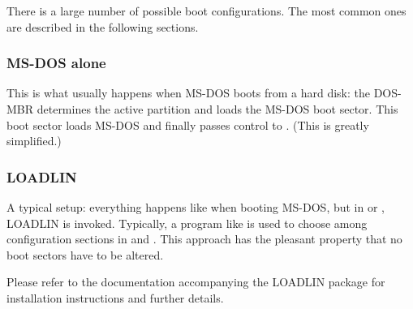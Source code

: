 There is a large number of possible boot configurations. The most common
ones are described in the following sections.


\subsubsection{MS-DOS alone}


This is what usually happens when MS-DOS boots from a hard disk: the DOS-MBR
determines the active partition and loads the MS-DOS boot sector. This boot
sector loads MS-DOS and finally passes control to . (This is
greatly simplified.)


\subsubsection{LOADLIN}


A typical  setup: everything happens like when booting MS-DOS,
but in  or , LOADLIN is invoked. Typically,
a program like  is used to choose among configuration sections
in  and .
This approach has the pleasant property that no boot
sectors have to be altered.

Please refer to the documentation accompanying the LOADLIN package for
installation instructions and further details.


